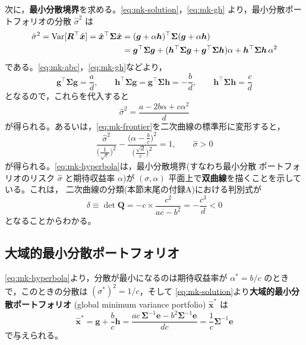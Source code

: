 次に，\textbf{最小分散境界}を求める。\eqref{eq:mk-solution}，\eqref{eq:mk-gh}
より，最小分散ポートフォリオの分散 $\hat\sigma^2$ は
\begin{align}
\hat\sigma^2 = \mathrm{Var}[\bm{R}^\top\hat{\bm{x}}]
= \hat{\bm{x}}^\top\bm{\Sigma}\hat{\bm{x}}
&= (\bm{g}+\alpha\bm{h})^\top\bm{\Sigma}(\bm{g}+\alpha\bm{h})\notag\\
&= \bm{g}^\top\bm{\Sigma}\bm{g}
+ (\bm{h}^\top\bm{\Sigma}\bm{g} + \bm{g}^\top\bm{\Sigma}\bm{h})\alpha
+ \bm{h}^\top\bm{\Sigma}\bm{h}\,\alpha^2
\end{align}
である。\eqref{eq:mk-abc}，\eqref{eq:mk-gh}などより，
\begin{equation}
\bm{g}^\top\bm{\Sigma}\bm{g} = \frac{a}{d},\qquad
\bm{h}^\top\bm{\Sigma}\bm{g} = \bm{g}^\top\bm{\Sigma}\bm{h} = -\frac{b}{d},\qquad
\bm{h}^\top\bm{\Sigma}\bm{h} = \frac{c}{d}
\end{equation}
となるので，これらを代入すると
\begin{equation}
\hat\sigma^2 = \frac{a - 2b\alpha + c\alpha^2}{d}
\label{eq:mk-frontier}
\end{equation}
が得られる。あるいは，\eqref{eq:mk-frontier}を二次曲線の標準形に変形すると，
\begin{equation}
\frac{\hat\sigma^2}{\bigl(\frac{1}{\sqrt{c}}\bigr)^2}
- \frac{\bigl(\alpha - \frac{b}{c}\bigr)^2}{\bigl(\frac{\sqrt{d}}{c}\bigr)^2} = 1,
\qquad \hat\sigma > 0
\label{eq:mk-hyperbola}
\end{equation}
が得られる。\eqref{eq:mk-hyperbola}は，最小分散境界(すなわち最小分散
ポートフォリオのリスク $\hat\sigma$ と期待収益率 $\alpha$)が
$(\sigma,\alpha)$ 平面上で\textbf{双曲線}を描くことを示している。これは，
二次曲線の分類(本節末尾の付録A)における判別式が
\begin{equation}
\delta \equiv \det\bm{Q} = -c\times\frac{c^2}{ac-b^2} = -\frac{c^3}{d} < 0
\end{equation}
となることからわかる。

\subsection{大域的最小分散ポートフォリオ}

\eqref{eq:mk-hyperbola}より，分散が最小になるのは期待収益率が
$\alpha^* = b/c$ のときで，このときの分散は $(\sigma^*)^2 = 1/c$，そして
\eqref{eq:mk-solution}より\textbf{大域的最小分散ポートフォリオ}
(global minimum variance portfolio) $\hat{\bm{x}}^*$ は
\begin{equation}
\hat{\bm{x}}^* = \bm{g} + \frac{b}{c}\bm{h}
= \frac{ac\,\bm{\Sigma}^{-1}\bm{e} - b^2\bm{\Sigma}^{-1}\bm{e}}{dc}
= \frac{1}{c}\bm{\Sigma}^{-1}\bm{e}
\end{equation}
で与えられる。

